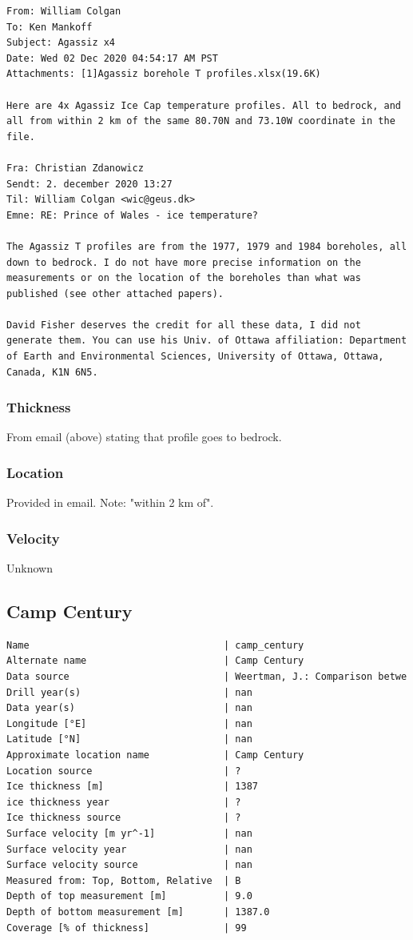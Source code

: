 \documentclass[article,a4paper,times,11pt,twoside]{article}
\begin{document}
\begin{verbatim}
From: William Colgan
To: Ken Mankoff
Subject: Agassiz x4
Date: Wed 02 Dec 2020 04:54:17 AM PST
Attachments: [1]Agassiz borehole T profiles.xlsx(19.6K)

Here are 4x Agassiz Ice Cap temperature profiles. All to bedrock, and
all from within 2 km of the same 80.70N and 73.10W coordinate in the
file.

Fra: Christian Zdanowicz
Sendt: 2. december 2020 13:27
Til: William Colgan <wic@geus.dk>
Emne: RE: Prince of Wales - ice temperature?

The Agassiz T profiles are from the 1977, 1979 and 1984 boreholes, all
down to bedrock. I do not have more precise information on the
measurements or on the location of the boreholes than what was
published (see other attached papers).

David Fisher deserves the credit for all these data, I did not
generate them. You can use his Univ. of Ottawa affiliation: Department
of Earth and Environmental Sciences, University of Ottawa, Ottawa,
Canada, K1N 6N5.
\end{verbatim}

\subsubsection{Thickness}
\label{sec:org7189fdc}

From email (above) stating that profile goes to bedrock.

\subsubsection{Location}
\label{sec:org160c109}

Provided in email. Note: "within 2 km of".

\subsubsection{Velocity}
\label{sec:org60b3e9d}

Unknown
\clearpage
\subsection{Camp Century}
\label{sec:org70bfc24}
\begin{verbatim}
Name                                  | camp_century
Alternate name                        | Camp Century
Data source                           | Weertman, J.: Comparison betwe
Drill year(s)                         | nan
Data year(s)                          | nan
Longitude [°E]                        | nan
Latitude [°N]                         | nan
Approximate location name             | Camp Century
Location source                       | ?
Ice thickness [m]                     | 1387
ice thickness year                    | ?
Ice thickness source                  | ?
Surface velocity [m yr^-1]            | nan
Surface velocity year                 | nan
Surface velocity source               | nan
Measured from: Top, Bottom, Relative  | B
Depth of top measurement [m]          | 9.0
Depth of bottom measurement [m]       | 1387.0
Coverage [% of thickness]             | 99
\end{verbatim}
\end{document}
